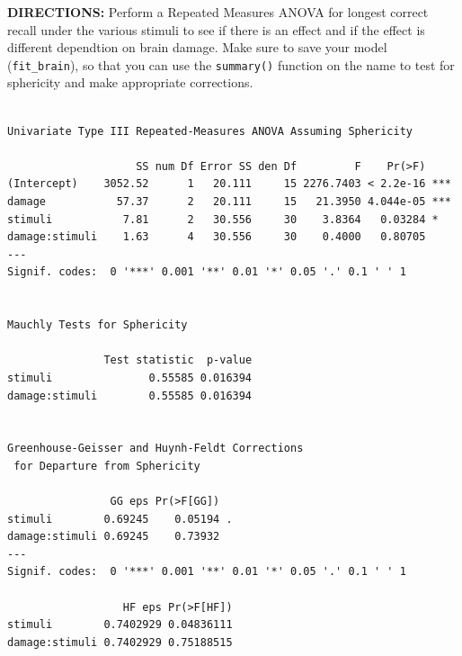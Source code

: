 \documentclass[]{article}
\newenvironment{Shaded}{\begin{snugshade}}{\end{snugshade}}
\newcommand{\KeywordTok}[1]{\textcolor[rgb]{0.13,0.29,0.53}{\textbf{#1}}}
\newcommand{\DataTypeTok}[1]{\textcolor[rgb]{0.13,0.29,0.53}{#1}}
\newcommand{\StringTok}[1]{\textcolor[rgb]{0.31,0.60,0.02}{#1}}
\newcommand{\CommentTok}[1]{\textcolor[rgb]{0.56,0.35,0.01}{\textit{#1}}}
\newcommand{\OperatorTok}[1]{\textcolor[rgb]{0.81,0.36,0.00}{\textbf{#1}}}
\newcommand{\NormalTok}[1]{#1}
\begin{document}
\textbf{DIRECTIONS:} Perform a Repeated Measures ANOVA for longest
correct recall under the various stimuli to see if there is an effect
and if the effect is different dependtion on brain damage. Make sure to
save your model (\texttt{fit\_brain}), so that you can use the
\texttt{summary()} function on the name to test for sphericity and make
appropriate corrections.

\begin{Shaded}
\end{Shaded}

\begin{verbatim}

Univariate Type III Repeated-Measures ANOVA Assuming Sphericity

                    SS num Df Error SS den Df         F    Pr(>F)    
(Intercept)    3052.52      1   20.111     15 2276.7403 < 2.2e-16 ***
damage           57.37      2   20.111     15   21.3950 4.044e-05 ***
stimuli           7.81      2   30.556     30    3.8364   0.03284 *  
damage:stimuli    1.63      4   30.556     30    0.4000   0.80705    
---
Signif. codes:  0 '***' 0.001 '**' 0.01 '*' 0.05 '.' 0.1 ' ' 1


Mauchly Tests for Sphericity

               Test statistic  p-value
stimuli               0.55585 0.016394
damage:stimuli        0.55585 0.016394


Greenhouse-Geisser and Huynh-Feldt Corrections
 for Departure from Sphericity

                GG eps Pr(>F[GG])  
stimuli        0.69245    0.05194 .
damage:stimuli 0.69245    0.73932  
---
Signif. codes:  0 '***' 0.001 '**' 0.01 '*' 0.05 '.' 0.1 ' ' 1

                  HF eps Pr(>F[HF])
stimuli        0.7402929 0.04836111
damage:stimuli 0.7402929 0.75188515
\end{verbatim}
\end{document}
